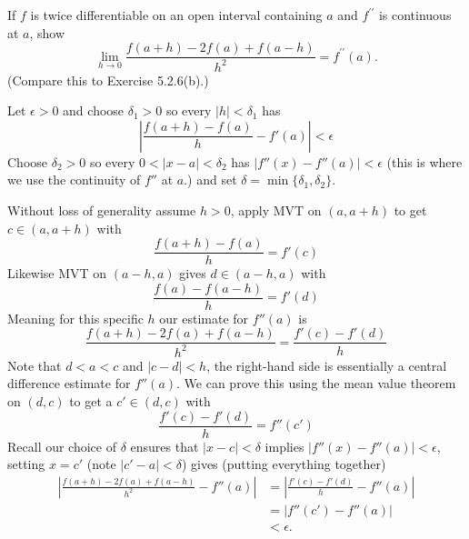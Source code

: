\begin{exercise}
  If $f$ is twice differentiable on an open interval containing $a$ and $f^{\prime \prime}$ is continuous at $a$, show
  $$
  \lim _{h \rightarrow 0} \frac{f(a+h)-2 f(a)+f(a-h)}{h^{2}}=f^{\prime \prime}(a) .
  $$
  (Compare this to Exercise 5.2.6(b).)
\end{exercise}
\begin{solution}
  Let $\epsilon > 0$ and choose $\delta_1 > 0$ so every $|h| < \delta_1$ has
  $$
  \left|\frac{f(a+h) - f(a)}{h} - f'(a)\right| < \epsilon
  $$
  Choose $\delta_2 > 0$ so every $0<|x-a|<\delta_2$ has $|f''(x)-f''(a)|<\epsilon$ (this is where we use the continuity of $f''$ at $a$.) and set $\delta = \min\{\delta_1,\delta_2\}$.

  Without loss of generality assume $h > 0$, apply MVT on $(a,a+h)$ to get $c \in (a,a+h)$ with
  $$
  \frac{f(a+h) - f(a)}{h} = f'(c)
  $$
  Likewise MVT on $(a-h,a)$ gives $d \in (a-h,a)$ with
  $$
  \frac{f(a) - f(a-h)}{h} = f'(d)
  $$
  Meaning for this specific $h$ our estimate for $f''(a)$ is
  $$
  \frac{f(a+h)-2 f(a)+f(a-h)}{h^{2}} = \frac{f'(c) - f'(d)}{h}
  $$
  Note that $d < a < c$ and $|c-d| < h$, the right-hand side is essentially a central difference estimate for $f''(a)$. We can prove this using the mean value theorem on $(d,c)$ to get a $c' \in (d,c)$ with
  $$
  \frac{f'(c) - f'(d)}{h} = f''(c')
  $$
  Recall our choice of $\delta$ ensures that $|x-c|<\delta$ implies $|f''(x)-f''(a)|<\epsilon$, setting $x=c'$ (note $|c'-a|<\delta$) gives (putting everything together)
  $$
  \begin{aligned}
  \left|\frac{f(a+h)-2 f(a)+f(a-h)}{h^{2}} - f''(a)\right|
  &= \left|\frac{f'(c) - f'(d)}{h} - f''(a)\right| \\
  &= \left|f''(c') - f''(a)\right| \\
  &< \epsilon.
  \end{aligned}
  $$
\end{solution}

